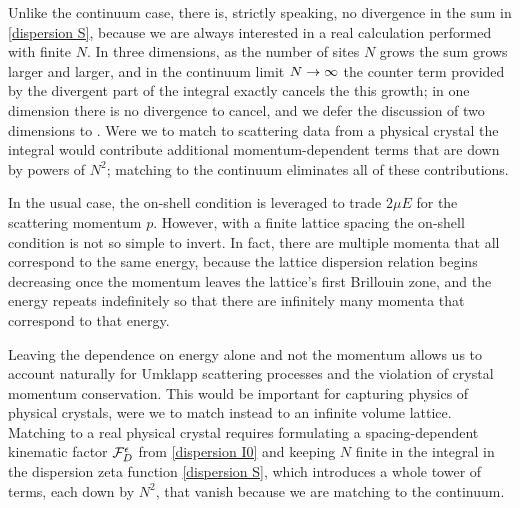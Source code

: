 Unlike the continuum case, there is, strictly speaking, no divergence in the sum in \eqref{dispersion S}, because we are always interested in a real calculation performed with finite $N$.
In three dimensions, as the number of sites $N$ grows the sum grows larger and larger, and in the continuum limit $N\rightarrow\infty$ the counter term provided by the divergent part of the integral exactly cancels the this growth; in one dimension there is no divergence to cancel, and we defer the discussion of two dimensions to .
Were we to match to scattering data from a physical crystal the integral would contribute additional momentum-dependent terms that are down by powers of $N^2$; matching to the continuum eliminates all of these contributions.


In the usual case, the on-shell condition is leveraged to trade $2\mu E$ for the scattering momentum $p$.  However, with a finite lattice spacing the on-shell condition is not so simple to invert.
In fact, there are multiple momenta that all correspond to the same energy, because the lattice dispersion relation begins decreasing once the momentum leaves the lattice's first Brillouin zone, and the energy repeats indefinitely so that there are infinitely many momenta that correspond to that energy.

Leaving the dependence on energy alone and not the momentum allows us to account naturally for Umklapp scattering processes and the violation of crystal momentum conservation.
This would be important for capturing physics of physical crystals, were we to match instead to an infinite volume lattice.
Matching to a real physical crystal requires formulating a spacing-dependent kinematic factor $\mathcal{F}_D^\epsilon$ from \eqref{dispersion I0} and keeping $N$ finite in the integral in the dispersion zeta function \eqref{dispersion S}, which introduces a whole tower of terms, each down by $N^2$, that vanish because we are matching to the continuum.

